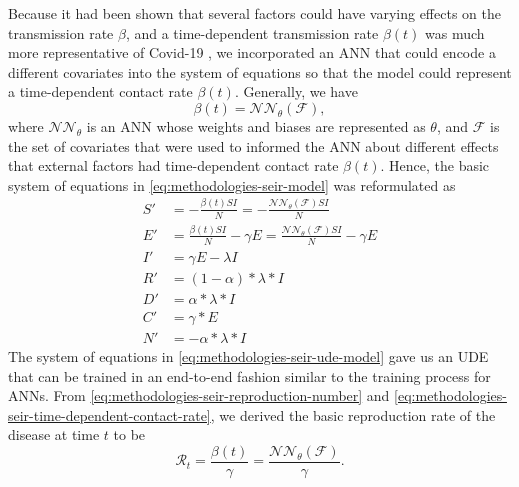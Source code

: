 Because it had been shown that several factors could have varying effects on the transmission rate $\beta$, and a time-dependent transmission rate $\beta(t)$ was much more representative of Covid-19 \cite{arikInterpretableSequenceLearning, changMobilityNetworkModels2021, dandekarMachineLearningAidedGlobal2020a, ihmecovid-19forecastingteamModelingCOVID19Scenarios2021, liSubstantialUndocumentedInfection2020}, we incorporated an \gls{ANN} that could encode a different covariates into the system of equations so that the model could represent a time-dependent contact rate $\beta(t)$.
Generally, we have
\begin{equation}
    \beta(t) = \mathcal{NN}_\theta (\mathcal{F}),
    \label{eq:methodologies-seir-time-dependent-contact-rate}
\end{equation}
where $\mathcal{NN}_\theta$ is an \gls{ANN} whose weights and biases are represented as $\theta$, and $\mathcal{F}$ is the set of covariates that were used to informed the \gls{ANN} about different effects that external factors had time-dependent contact rate $\beta(t)$.
Hence, the basic system of equations in \autoref{eq:methodologies-seir-model} was reformulated as
\begin{equation}
    \begin{aligned}
        S' &= - \frac{\beta(t) SI}{N} = -\frac{\mathcal{NN}_\theta(\mathcal{F}) SI}{N} \\
        E' &= \frac{\beta(t) SI}{N} - \gamma E = \frac{\mathcal{NN}_\theta(\mathcal{F}) SI}{N} - \gamma E \\
        I' &= \gamma E - \lambda I \\
        R' &= (1 - \alpha) * \lambda * I \\
        D' &= \alpha * \lambda * I \\
        C' &= \gamma * E \\
        N' &= - \alpha * \lambda * I
    \end{aligned}
    \label{eq:methodologies-seir-ude-model}
\end{equation}
The system of equations in \autoref{eq:methodologies-seir-ude-model} gave us an \gls{UDE} \cite{rackauckasUniversalDifferentialEquations2020} that can be trained in an end-to-end fashion similar to the training process for \glspl{ANN}.
From \autoref{eq:methodologies-seir-reproduction-number} and \autoref{eq:methodologies-seir-time-dependent-contact-rate}, we derived the basic reproduction rate of the disease at time $t$ to be
\begin{equation*}
    \mathcal{R}_t = \frac{\beta(t)}{\gamma} = \frac{\mathcal{NN}_\theta(\mathcal{F})}{\gamma}.
\end{equation*}

